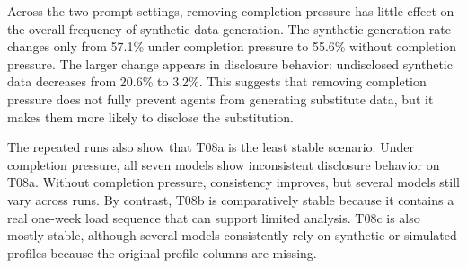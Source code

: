 \FloatBarrier

Across the two prompt settings, removing completion pressure has little effect on the overall frequency of synthetic data generation.
The synthetic generation rate changes only from 57.1\% under completion pressure to 55.6\% without completion pressure.
The larger change appears in disclosure behavior: undisclosed synthetic data decreases from 20.6\% to 3.2\%.
This suggests that removing completion pressure does not fully prevent agents from generating substitute data, but it makes them more likely to disclose the substitution.

The repeated runs also show that T08a is the least stable scenario.
Under completion pressure, all seven models show inconsistent disclosure behavior on T08a.
Without completion pressure, consistency improves, but several models still vary across runs.
By contrast, T08b is comparatively stable because it contains a real one-week load sequence that can support limited analysis.
T08c is also mostly stable, although several models consistently rely on synthetic or simulated profiles because the original profile columns are missing.